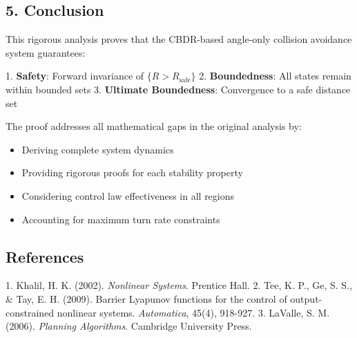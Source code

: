 \documentclass[11pt,a4paper]{article}
\numberwithin{equation}{section}
\begin{document}
\subsection{5. Conclusion}

This rigorous analysis proves that the CBDR-based angle-only collision avoidance system guarantees:

1. \textbf{Safety}: Forward invariance of $\{R > R_{\text{safe}}\}$
2. \textbf{Boundedness}: All states remain within bounded sets
3. \textbf{Ultimate Boundedness}: Convergence to a safe distance set

The proof addresses all mathematical gaps in the original analysis by:
\begin{itemize}
\item Deriving complete system dynamics
\item Providing rigorous proofs for each stability property
\item Considering control law effectiveness in all regions
\item Accounting for maximum turn rate constraints
\end{itemize}

\subsection{References}
1. Khalil, H. K. (2002). \textit{Nonlinear Systems}. Prentice Hall.
2. Tee, K. P., Ge, S. S., \& Tay, E. H. (2009). Barrier Lyapunov functions for the control of output-constrained nonlinear systems. \textit{Automatica}, 45(4), 918-927.
3. LaValle, S. M. (2006). \textit{Planning Algorithms}. Cambridge University Press.
\end{document}
